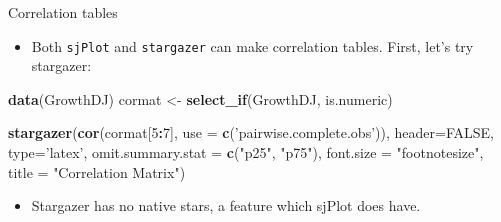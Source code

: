 \documentclass[
  10pt,
  ignorenonframetext,
]{beamer}
\newenvironment{Shaded}{\begin{snugshade}}{\end{snugshade}}
\newcommand{\DataTypeTok}[1]{\textcolor[rgb]{0.13,0.29,0.53}{#1}}
\newcommand{\DecValTok}[1]{\textcolor[rgb]{0.00,0.00,0.81}{#1}}
\newcommand{\KeywordTok}[1]{\textcolor[rgb]{0.13,0.29,0.53}{\textbf{#1}}}
\newcommand{\NormalTok}[1]{#1}
\newcommand{\OperatorTok}[1]{\textcolor[rgb]{0.81,0.36,0.00}{\textbf{#1}}}
\newcommand{\OtherTok}[1]{\textcolor[rgb]{0.56,0.35,0.01}{#1}}
\newcommand{\StringTok}[1]{\textcolor[rgb]{0.31,0.60,0.02}{#1}}
\providecommand{\tightlist}{%
  \setlength{\itemsep}{0pt}\setlength{\parskip}{0pt}}
\begin{document}
\begin{frame}[fragile]{Correlation tables}
\protect\hypertarget{correlation-tables}{}

\begin{itemize}
\tightlist
\item
  Both \texttt{sjPlot} and \texttt{stargazer} can make correlation
  tables. First, let's try stargazer:
\end{itemize}

\begin{Shaded}
\begin{Highlighting}[]
\KeywordTok{data}\NormalTok{(GrowthDJ)}
\NormalTok{cormat <-}\StringTok{ }\KeywordTok{select_if}\NormalTok{(GrowthDJ, is.numeric)}
\end{Highlighting}
\end{Shaded}

\begin{Shaded}
\begin{Highlighting}[]
\KeywordTok{stargazer}\NormalTok{(}\KeywordTok{cor}\NormalTok{(cormat[}\DecValTok{5}\OperatorTok{:}\DecValTok{7}\NormalTok{], }
              \DataTypeTok{use =} \KeywordTok{c}\NormalTok{(}\StringTok{'pairwise.complete.obs'}\NormalTok{)),}
          \DataTypeTok{header=}\OtherTok{FALSE}\NormalTok{, }\DataTypeTok{type=}\StringTok{'latex'}\NormalTok{,}
          \DataTypeTok{omit.summary.stat =} \KeywordTok{c}\NormalTok{(}\StringTok{"p25"}\NormalTok{, }\StringTok{"p75"}\NormalTok{), }
          \DataTypeTok{font.size =} \StringTok{"footnotesize"}\NormalTok{,}
          \DataTypeTok{title =} \StringTok{"Correlation Matrix"}\NormalTok{)}
\end{Highlighting}
\end{Shaded}

\begin{itemize}
\tightlist
\item
  Stargazer has no native stars, a feature which sjPlot does have.
\end{itemize}

\end{frame}
\end{document}
